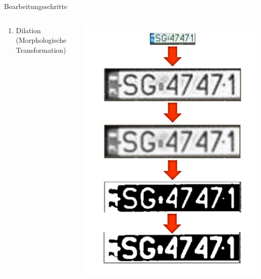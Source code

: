 \begin{frame}{Bearbeitungsschritte}
\begin{columns}
\begin{column}{0.6\textwidth}
\begin{enumerate}
\item {\small Dilation (Morphologische Transformation)}
\end{enumerate}
\end{column}
\begin{column}{0.40\textwidth}
    \begin{center}
        \includegraphics[width=\textwidth]{img/preprocessing}
    \end{center}
\end{column}
\end{columns}
\end{frame}

